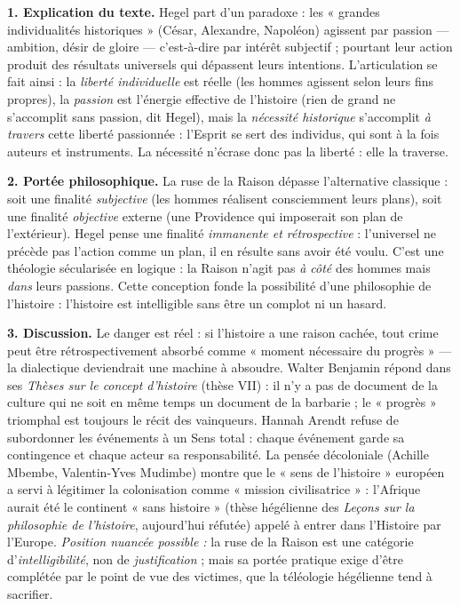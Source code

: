 \documentclass[11pt]{article}
\begin{document}
\begin{corrige}
\textbf{1. Explication du texte.} Hegel part d'un paradoxe : les « grandes individualités historiques » (César, Alexandre, Napoléon) agissent par passion — ambition, désir de gloire — c'est-à-dire par intérêt subjectif ; pourtant leur action produit des résultats universels qui dépassent leurs intentions. L'articulation se fait ainsi : la \emph{liberté individuelle} est réelle (les hommes agissent selon leurs fins propres), la \emph{passion} est l'énergie effective de l'histoire (rien de grand ne s'accomplit sans passion, dit Hegel), mais la \emph{nécessité historique} s'accomplit \emph{à travers} cette liberté passionnée : l'Esprit se sert des individus, qui sont à la fois auteurs et instruments. La nécessité n'écrase donc pas la liberté : elle la traverse.

\textbf{2. Portée philosophique.} La ruse de la Raison dépasse l'alternative classique : soit une finalité \emph{subjective} (les hommes réalisent consciemment leurs plans), soit une finalité \emph{objective} externe (une Providence qui imposerait son plan de l'extérieur). Hegel pense une finalité \emph{immanente et rétrospective} : l'universel ne précède pas l'action comme un plan, il en résulte sans avoir été voulu. C'est une théologie sécularisée en logique : la Raison n'agit pas \emph{à côté} des hommes mais \emph{dans} leurs passions. Cette conception fonde la possibilité d'une philosophie de l'histoire : l'histoire est intelligible sans être un complot ni un hasard.

\textbf{3. Discussion.} Le danger est réel : si l'histoire a une raison cachée, tout crime peut être rétrospectivement absorbé comme « moment nécessaire du progrès » — la dialectique deviendrait une machine à absoudre. Walter Benjamin répond dans ses \emph{Thèses sur le concept d'histoire} (thèse VII) : il n'y a pas de document de la culture qui ne soit en même temps un document de la barbarie ; le « progrès » triomphal est toujours le récit des vainqueurs. Hannah Arendt refuse de subordonner les événements à un Sens total : chaque événement garde sa contingence et chaque acteur sa responsabilité. La pensée décoloniale (Achille Mbembe, Valentin-Yves Mudimbe) montre que le « sens de l'histoire » européen a servi à légitimer la colonisation comme « mission civilisatrice » : l'Afrique aurait été le continent « sans histoire » (thèse hégélienne des \emph{Leçons sur la philosophie de l'histoire}, aujourd'hui réfutée) appelé à entrer dans l'Histoire par l'Europe. \emph{Position nuancée possible :} la ruse de la Raison est une catégorie d'\emph{intelligibilité}, non de \emph{justification} ; mais sa portée pratique exige d'être complétée par le point de vue des victimes, que la téléologie hégélienne tend à sacrifier.


\end{corrige}
\end{document}
